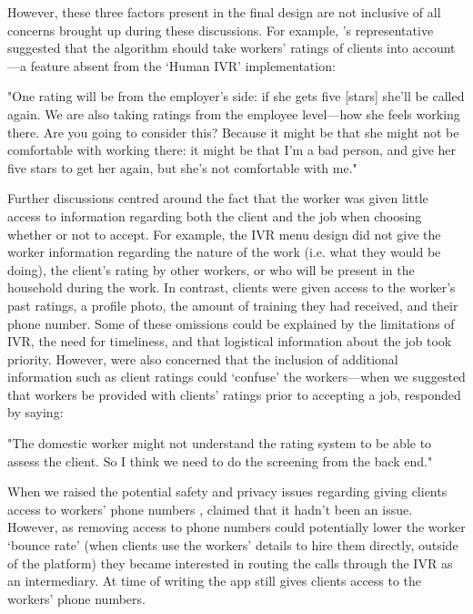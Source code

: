 However, these three factors present in the final design are not inclusive of all concerns brought up during these discussions. For example, \NGO{}'s representative suggested that the algorithm should take workers' ratings of clients into account---a feature absent from the `Human IVR' implementation:

\begin{displayquote}
"One rating will be from the employer’s side: if she gets five [stars] she’ll be called again. We are also taking ratings from the employee level---how she feels working there. Are you going to consider this? Because it might be that she might not be comfortable with working there: it might be that I’m a bad person, and give her five stars to get her again, but she’s not comfortable with me."
\end{displayquote}

Further discussions centred around the fact that the worker was given little access to information regarding both the client and the job when choosing whether or not to accept. For example, the IVR menu design did not give the worker information regarding the nature of the work (i.e. what they would be doing), the client's rating by other workers, or who will be present in the household during the work. In contrast, clients were given access to the worker's past ratings, a profile photo, the amount of training they had received, and their phone number. Some of these omissions could be explained by the limitations of IVR, the need for timeliness, and that logistical information about the job took priority. However, \PC{} were also concerned that the inclusion of additional information such as client ratings could `confuse' the workers---when we suggested that workers be provided with clients' ratings prior to accepting a job, \PC{} responded by saying:

\begin{displayquote}
"The domestic worker might not understand the rating system to be able to assess the client. So I think we need to do the screening from the back end."
\end{displayquote}

When we raised the potential safety and privacy issues regarding giving clients access to workers' phone numbers \cite{Sambasivan2019}, \PC{} claimed that it hadn't been an issue. However, as removing access to phone numbers could potentially lower the worker `bounce rate' (when clients use the workers' details to hire them directly, outside of the \PC{} platform) they became interested in routing the calls through the IVR as an intermediary. At time of writing the app still gives clients access to the workers' phone numbers. 

